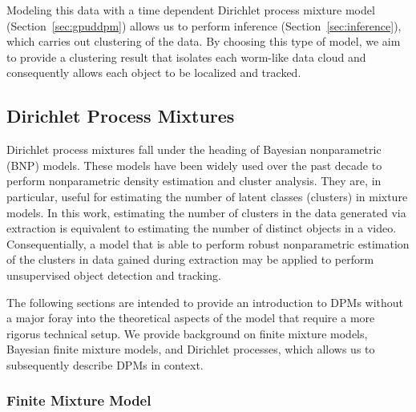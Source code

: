 \documentclass[smallcondensed, final]{svjour3}
\begin{document}
Modeling this data with a time dependent Dirichlet process mixture model (Section~\ref{sec:gpuddpm}) allows us to perform inference (Section~\ref{sec:inference}), which carries out clustering of the data. By choosing this type of model, we aim to provide a clustering result that isolates each worm-like data cloud and consequently allows each object to be localized and tracked.




\subsection{Dirichlet Process Mixtures}
\label{sec:dpm}

Dirichlet process mixtures fall under the heading of Bayesian nonparametric (BNP) models. These models have been widely used over the past decade to perform nonparametric density estimation and cluster analysis. They are, in particular, useful for estimating the number of latent classes (clusters) in mixture models. In this work, estimating the number of clusters in the data generated via extraction is equivalent to estimating the number of distinct objects in a video. Consequentially, a model that is able to perform robust nonparametric estimation of the clusters in data gained during extraction may be applied to perform unsupervised object detection and tracking.

The following sections are intended to provide an introduction to DPMs without a major foray into the theoretical aspects of the model that require a more rigorus technical setup. We provide background on finite mixture models, Bayesian finite mixture models, and Dirichlet processes, which allows us to subsequently describe DPMs in context. 






\subsubsection{Finite Mixture Model}
\label{sec:finite_mixture}
\end{document}
